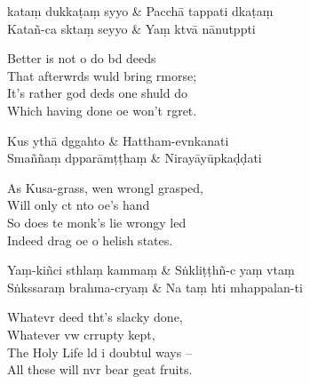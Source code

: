 \begin{twochants}
  kataṃ dukkaṭaṃ syyo & Pacchā tappati dkaṭaṃ \\
  Katañ-ca sktaṃ seyyo & Yaṃ ktvā nānutppti \\
\end{twochants}

\begin{english}
  Better is not o do bd deeds\\
  That afterwrds wuld bring rmorse;\\
  It's rather god deds one shuld do\\
  Which having done oe won't rgret.
\end{english}

\begin{twochants}
  Kus ythā dggahto & Hattham-evnkanati \\
  Smaññaṃ dpparāmṭṭhaṃ & Nirayāyūpkaḍḍati \\
\end{twochants}

\begin{english}
  As Kusa-grass, wen wrongl grasped,\\
  Will only ct nto oe's hand\\
  So does te monk's lie wrongy led\\
  Indeed drag oe o helish states.
\end{english}

\begin{twochants}
  Yaṃ-kiñci sthlaṃ kammaṃ & Sṅkliṭṭhñ-c yaṃ vtaṃ \\
  Sṅkssaraṃ brahma-cryaṃ & Na taṃ hti mhappalan-ti \\
\end{twochants}

\begin{english}
  Whatevr deed tht's slacky done,\\
  Whatever vw crrupty kept,\\
  The Holy Life ld i doubtul ways --\\
  All these will nvr bear geat fruits.
\end{english}


